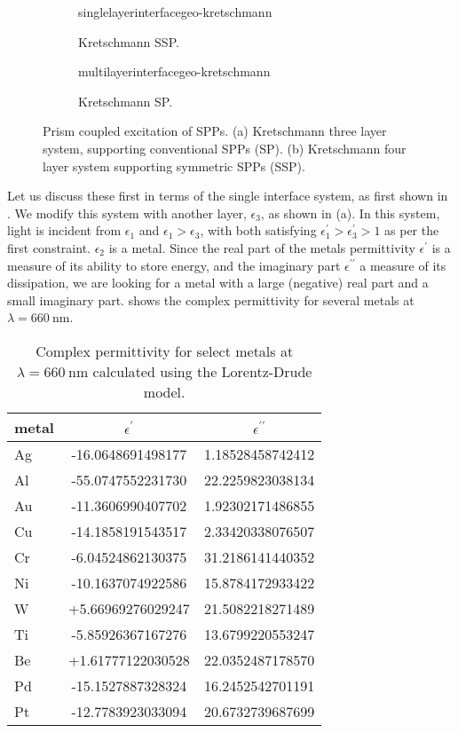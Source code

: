 \begin{figure}[ht]
 \centering
 \begin{subfigure}[b]{0.4\textwidth}
  \centering
  {singlelayerinterfacegeo-kretschmann}
  \caption{Kretschmann SSP.}
 \end{subfigure}
 \begin{subfigure}[b]{0.4\textwidth}
  \centering
  {multilayerinterfacegeo-kretschmann}
  \caption{Kretschmann SP.}
 \end{subfigure}
\caption{Prism coupled excitation of SPPs.  (a) Kretschmann three layer
system, supporting conventional SPPs (SP).  (b) Kretschmann
four layer system supporting symmetric SPPs (SSP). }
\label{fig:prismcoupledsetups}
\end{figure}
Let us discuss these first in terms of the single interface system, as
first shown in .  We modify this system with
another layer, $\epsilon_3$, as shown in
(a).  In this system, light is incident from
$\epsilon_1$ and $\epsilon_1>\epsilon_3$, with both satisfying
$\epsilon^\prime_1>\epsilon^\prime_3>1$ as per the first constraint.
$\epsilon_2$ is a metal.  Since the real part of the metals permittivity
$\epsilon^\prime$ is a measure of its ability to store energy, and the
imaginary part $\epsilon^{\prime\prime}$ a measure of its dissipation, we
are looking for a metal with a large (negative) real part and a small
imaginary part.   shows the complex permittivity for
several metals at $\lambda=\SI{660}{\nano\meter}$.

\begin{table}[ht]
\centering
{}
\begin{tabular}{lSS}
\toprule
metal & {$\epsilon^\prime$} & {$\epsilon^{\prime\prime}$} \\
\midrule
Ag & -16.0648691498177 & 1.18528458742412\\
Al & -55.0747552231730 & 22.2259823038134\\
Au & -11.3606990407702 & 1.92302171486855\\
Cu & -14.1858191543517 & 2.33420338076507\\
Cr & -6.04524862130375 & 31.2186141440352\\
Ni & -10.1637074922586 & 15.8784172933422\\
W  & +5.66969276029247 & 21.5082218271489\\
Ti & -5.85926367167276 & 13.6799220553247\\
Be & +1.61777122030528 & 22.0352487178570\\
Pd & -15.1527887328324 & 16.2452542701191\\
Pt & -12.7783923033094 & 20.6732739687699\\
\bottomrule
\end{tabular}
\caption{Complex permittivity for select metals at
$\lambda=\SI{660}{\nano\meter}$ calculated using the Lorentz-Drude model.}
\label{tbl:epsmetal600}
\end{table}

